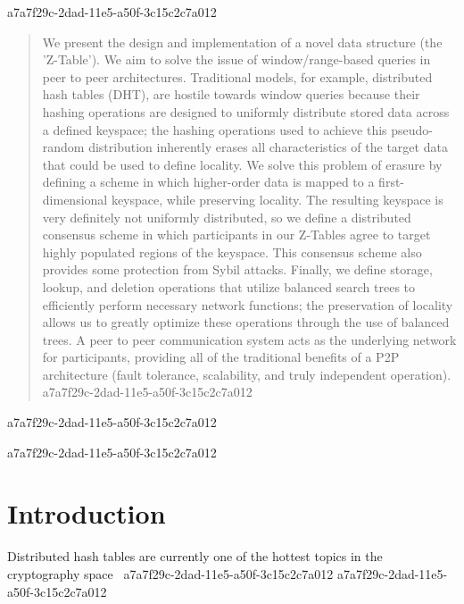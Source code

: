 \documentclass[12pt]{article}
\begin{document}
a7a7f29c-2dad-11e5-a50f-3c15c2c7a012\maketitle

\begin{abstract}
We present the design and implementation of a novel data structure (the 'Z-Table'). We aim to solve the issue of window/range-based queries in peer to peer architectures. Traditional models, for example,  distributed hash tables (DHT), are hostile towards window queries because their hashing operations are designed to uniformly distribute stored data across a defined keyspace; the hashing operations used to achieve this pseudo-random distribution inherently erases all characteristics of the target data that could be used to define locality. We solve this problem of erasure by defining a scheme in which higher-order data is mapped to a first-dimensional keyspace, while preserving locality. The resulting keyspace is very definitely not uniformly distributed, so we define a distributed consensus scheme in which participants in our Z-Tables agree to target highly populated regions of the keyspace. This consensus scheme also provides some protection from Sybil attacks. Finally, we define storage, lookup, and deletion operations that utilize balanced search trees to efficiently perform necessary network functions; the preservation of locality allows us to greatly optimize these operations through the use of balanced trees. A peer to peer communication system acts as the underlying network for participants, providing all of the traditional benefits of a P2P architecture (fault tolerance, scalability, and truly independent operation).
a7a7f29c-2dad-11e5-a50f-3c15c2c7a012\end{abstract}
a7a7f29c-2dad-11e5-a50f-3c15c2c7a012

a7a7f29c-2dad-11e5-a50f-3c15c2c7a012\newpage
\section{Introduction}
Distributed hash tables are currently one of the hottest topics in the cryptography space~\cite{Stoica:2001dj,Rowstron:2001ea,Ratnasamy:2001wn}
a7a7f29c-2dad-11e5-a50f-3c15c2c7a012
a7a7f29c-2dad-11e5-a50f-3c15c2c7a012\printbibliography
\end{document}
